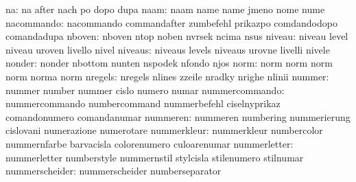                        na: na                        after
                           nach                      po
                           dopo                      dupa
                     naam: naam                      name
                           name                      jmeno
                           nome                      nume
               nacommando: nacommando                commandafter
                           zumbefehl                 prikazpo
                           comdandodopo              comandadupa
                   nboven: nboven                    ntop
                           noben                     nvrsek
                           ncima                     nsus
                   niveau: niveau                    level
                           niveau                    uroven
                           livello                   nivel
                  niveaus: niveaus                   levels
                           niveaus                   urovne
                           livelli                   nivele
                   nonder: nonder                    nbottom
                           nunten                    nspodek
                           nfondo                    njos
                     norm: norm                      norm
                           norm                      norm
                           norma                     norm
                  nregels: nregels                   nlines
                           zzeile                    nradky
                           nrighe                    nlinii
                   nummer: nummer                    number
                           nummer                    cislo
                           numero                    numar
           nummercommando: nummercommando            numbercommand
                           nummerbefehl              ciselnyprikaz
                           comandonumero             comandanumar
                 nummeren: nummeren                  numbering
                           nummerierung              cislovani
                           numerazione               numerotare
              nummerkleur: nummerkleur               numbercolor
                           nummernfarbe              barvacisla
                           colorenumero              culoarenumar
             nummerletter: nummerletter              numberstyle
                           nummernstil               stylcisla
                           stilenumero               stilnumar
           nummerscheider: nummerscheider            numberseparator
